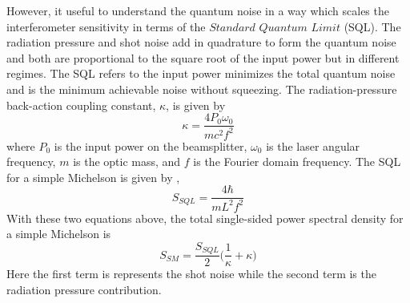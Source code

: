 	However, it useful to understand the quantum noise in a way which scales the interferometer sensitivity in terms of the $\textit{Standard Quantum Limit}$ (SQL).   The radiation pressure and shot noise add in quadrature to form the quantum noise and both are proportional to the square root of the input power but in different regimes.  The SQL refers to the input power minimizes the total quantum noise and is the minimum achievable noise without squeezing.  The radiation-pressure back-action coupling constant, $\kappa$, is given by \cite{KimbleConversion}
	\begin{equation}
	\kappa = \frac{4 P_0 \omega_{0}}{m c^2 f^2}
	\end{equation}
	where $P_0$ is the input power on the beamsplitter, $\omega_{0}$ is the laser angular frequency, $m$ is the optic mass, and $f$ is the Fourier domain frequency.  The SQL for a simple Michelson is given by \cite{KimbleConversion},
	\begin{equation}
	S_{SQL} = \frac{4 \hbar}{m L^2 f^2}
	\end{equation}
	With these two equations above, the total single-sided power spectral density for a simple Michelson is
	\begin{equation}
	S_{SM} = \frac{S_{SQL}}{2} \bigg( \frac{1}{\kappa}  + \kappa\bigg)
	\end{equation}
	Here the first term is represents the shot noise while the second term is the radiation pressure contribution. 
